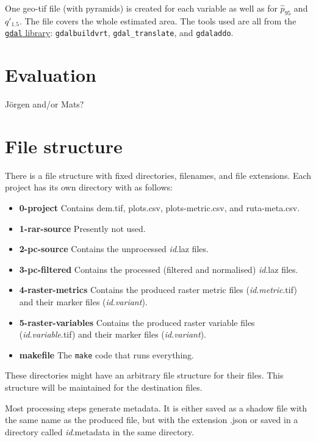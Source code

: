 \documentclass[english,a4paper,minion,nofigsidecaption]{article}
\newcommand{\file}[1]{\textsf{#1}}
\newcommand{\id}{\emph{id}}
\newcommand{\first}[1]{\ensuremath{\hat{#1}}}
\newcommand{\perc}[1]{\ensuremath{\first{p}_{#1}}}
\newcommand{\prop}[1]{\ensuremath{q'_{#1}}}
\begin{document}
One geo-tif file (with pyramids) is created for each variable as well as for \perc{95} and \prop{1.5}. The file covers the whole estimated area. 
The tools used are all from the \href{https://gdal.org}{\texttt{gdal} library}: \verb|gdalbuildvrt|, \verb|gdal_translate|, and \verb|gdaladdo|.


\newpage
\section{Evaluation}

Jörgen and/or Mats?




\section{File structure}

There is a file structure with fixed directories, filenames, and file extensions.
Each project has its own directory with as follows:
\begin{itemize}
	\item\file{\textbf{0-project}} Contains \file{dem.tif}, \file{plots.csv}, \file{plots-metric.csv}, and \file{ruta-meta.csv}.
	\item\file{\textbf{1-rar-source}} Presently not used.
	\item\file{\textbf{2-pc-source}} Contains the unprocessed \file{{\id}.laz} files.
	\item\file{\textbf{3-pc-filtered}} Contains the processed (filtered and normalised) \file{{\id}.laz} files.
	\item\file{\textbf{4-raster-metrics}} Contains the produced raster metric files (\file{{\id}.\emph{metric}.tif}) and their marker files (\file{{\id}.\emph{variant}}). 
	\item\file{\textbf{5-raster-variables}} Contains the produced raster variable files (\file{{\id}.\emph{variable}.tif}) and their marker files (\file{{\id}.\emph{variant}}). 
	\item\file{\textbf{makefile}} The \texttt{make} code that runs everything. 
\end{itemize}
These directories might have an arbitrary file structure for their files. This structure will be maintained for the destination files. 

Most processing steps generate metadata. It is either saved as a shadow file with the same name as the produced file, but with the extension \file{.json} or saved in a directory called \file{{\id}.metadata} in the same directory. 
\end{document}
